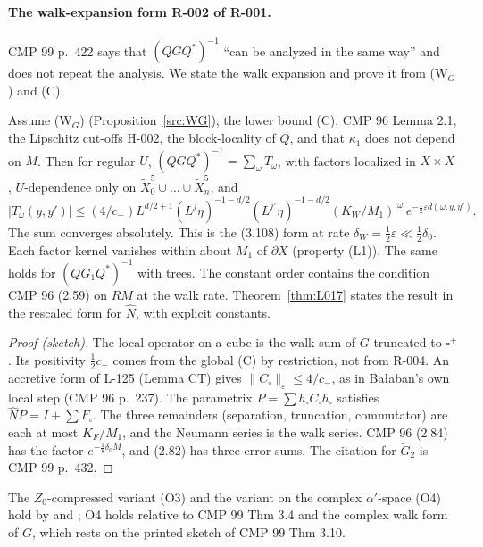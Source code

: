\paragraph{The walk-expansion form R-002 of R-001.}
CMP 99 p.~422 says that $(QGQ^*)^{-1}$ ``can be analyzed in the same way'' and does not repeat the analysis. We state the walk expansion and prove it from (W$_G$) and (C).

\begin{proposition}\label{src:A1-WALK}
Assume (W$_G$) (Proposition~\ref{src:WG}), the lower bound (C), CMP 96 Lemma 2.1, the Lipschitz cut-offs H-002, the block-locality of $Q$, and that $\kappa_1$ does not depend on $M$. Then for regular $U$, $(QGQ^*)^{-1}=\sum_\omega T_\omega$, with factors localized in $X\times X$, $U$-dependence only on $\tilde X_0^5\cup\dots\cup\tilde X_n^5$, and
\[
|T_\omega(y,y')|\le(4/c_-)L^{d/2+1}(L^j\eta)^{-1-d/2}(L^{j'}\eta)^{-1-d/2}(K_W/M_1)^{|\omega|}e^{-\frac12\varepsilon d(\omega,y,y')}.
\]
The sum converges absolutely. This is the (3.108) form at rate $\delta_W=\tfrac12\varepsilon\ll\tfrac12\delta_0$. Each factor kernel vanishes within about $M_1$ of $\partial X$ (property (L1)). The same holds for $(QG_1Q^*)^{-1}$ with trees. The constant order contains the condition CMP 96 (2.59) on $RM$ at the walk rate. Theorem~\ref{thm:L017} states the result in the rescaled form for $\hat N$, with explicit constants.
\end{proposition}
\begin{proof}[Proof (sketch)]
The local operator on a cube is the walk sum of $G$ truncated to $\square^+$. Its positivity $\tfrac12c_-$ comes from the global (C) by restriction, not from R-004. An accretive form of L-125 (Lemma CT) gives $\|C_\square\|_\varepsilon\le4/c_-$, as in Ba{\l}aban's own local step (CMP 96 p.~237). The parametrix $P=\sum h_\square C_\square h_\square$ satisfies $\hat NP=I+\sum F_\square$. The three remainders (separation, truncation, commutator) are each at most $K_F/M_1$, and the Neumann series is the walk series. CMP 96 (2.84) has the factor $e^{-\frac18\delta_0M}$, and (2.82) has three error sums. The citation for $\breve G_2$ is CMP 99 p.~432.
\end{proof}
The $Z_0$-compressed variant (O3) and the variant on the complex $\alpha'$-space (O4) hold by  and ; O4 holds relative to CMP 99 Thm 3.4 and the complex walk form of $G$, which rests on the printed sketch of CMP 99 Thm 3.10.

